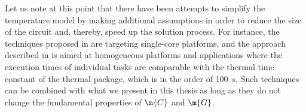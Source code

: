 Let us note at this point that there have been attempts to simplify the
temperature model by making additional assumptions in order to reduce the size
of the circuit and, thereby, speed up the solution process. For instance, the
techniques proposed in \cite{bao2010, rai2011} are targeting single-core
platforms, and the approach described in \cite{rao2009} is aimed at homogeneous
platforms and applications where the execution times of individual tasks are
comparable with the thermal time constant of the thermal package, which is in
the order of 100~s. Such techniques can be combined with what we present in this
thesis as long as they do not change the fundamental properties of $\m{C}$ and
$\m{G}$.

